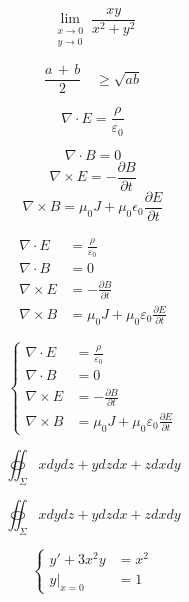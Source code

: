 \documentclass{ctexart}
\begin{document}
\[
\lim_{\substack{x \to 0 \\ y \to 0}} \frac{xy}{x^2+y^2}
\]

\[
\frac{a \, + \, b}{2}\quad \geq \sqrt{ab}
\]

\[
\nabla \cdot E = \frac{\rho}{\varepsilon_0}
\]

\[
\nabla \cdot B = 0
\]
\[
\nabla \times E = -\frac{\partial B}{\partial t}
\]
\[
\nabla \times B = \mu_0 J + \mu_0 \epsilon_0 \frac{\partial E}{\partial t}
\]

\[
\begin{aligned}
\nabla \cdot E &= \frac{\rho}{\varepsilon_0} \\
\nabla \cdot B &= 0 \\
\nabla \times E &= -\frac{\partial B}{\partial t} \\
\nabla \times B &= \mu_0 J + \mu_0 \varepsilon_0 \frac{\partial E}{\partial t}
\end{aligned}
\]

\[
\left\{
\begin{aligned}
\nabla \cdot E &= \frac{\rho}{\varepsilon_0} \\
\nabla \cdot B &= 0 \\
\nabla \times E &= -\frac{\partial B}{\partial t} \\
\nabla \times B &= \mu_0 J + \mu_0 \varepsilon_0 \frac{\partial E}{\partial t}
\end{aligned}
\right.
\]

\[
\displaystyle \oiint_\Sigma xdydz + ydzdx + zdxdy
\]

\[
\oiint_\Sigma xdydz + ydzdx + zdxdy
\]

\[
\begin{cases} y'+3x^2 y &= x^2 \\
 y\big|_{x=0} &= 1 \end{cases}
\]
\end{document}

